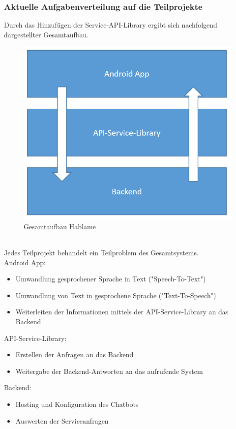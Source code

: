 \subsubsection{Aktuelle Aufgabenverteilung auf die Teilprojekte}
Durch das Hinzufügen der Service-API-Library ergibt sich nachfolgend dargestellter Gesamtaufbau.\\
\begin{figure}[h]
	\centering
	\includegraphics[width=0.7\linewidth]{ks/graphics/arch.png}
	\caption{Gesamtaufbau Hablame}
	\label{fig:arch}
\end{figure}\\
Jedes Teilprojekt behandelt ein Teilproblem des Gesamtsystems.\\
Android App:
\begin{itemize}\itemsep0pt
	\item Umwandlung gesprochener Sprache in Text ("Speech-To-Text")
	\item Umwandlung von Text in gesprochene Sprache ("Text-To-Speech")
	\item Weiterleiten der Informationen mittels der API-Service-Library an das Backend
\end{itemize}
API-Service-Library:
\begin{itemize}\itemsep0pt
	\item Erstellen der Anfragen an das Backend
	\item Weitergabe der Backend-Antworten an das aufrufende System
\end{itemize}
Backend:
\begin{itemize}\itemsep0pt
	\item Hosting und Konfiguration des Chatbots
	\item Auswerten der Serviceanfragen
\end{itemize}

